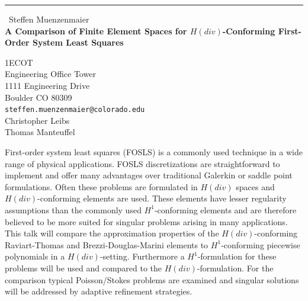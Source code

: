 \documentclass{report}
\begin{document}
\begin{center}
\rule{6in}{1pt} \
{\large Steffen Muenzenmaier \\
{\bf A Comparison of Finite Element Spaces for $H(div)$-Conforming First-Order System Least Squares}}

1ECOT \\ Engineering Office Tower \\ 1111 Engineering Drive \\ Boulder CO 80309
\\
{\tt steffen.muenzenmaier@colorado.edu}\\
Christopher Leibs\\
Thomas Manteuffel\end{center}

First-order system least squares (FOSLS) is a commonly used technique in
a wide range of physical applications. FOSLS discretizations are
straightforward to implement and offer many advantages over traditional
Galerkin or saddle point formulations. Often these problems are
formulated in $H(div)$ spaces and $H(div)$-conforming elements are used.
These elements have lesser regularity assumptions than the commonly used
$H^1$-conforming elements and are therefore believed to be more suited
for singular problems arising in many applications. This talk will
compare the approximation properties of the $H(div)$-conforming
Raviart-Thomas and Brezzi-Douglas-Marini elements to $H^1$-conforming
piecewise polynomials in a $H(div)$-setting. Furthermore a
$H^1$-formulation for these problems will be used and compared to the
$H(div)$-formulation. For the comparison typical Poisson/Stokes problems
are examined and singular solutions will be addressed by adaptive
refinement strategies.
\end{document}
